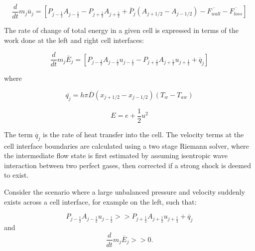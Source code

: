 \documentclass[a4paper,10pt]{article}
\begin{document}
\begin{equation}
\frac{d}{dt} m_{j} \overline{u}_{j} = \left [ P_{j-\frac{1}{2}} A_{j-\frac{1}{2}} - P_{j+\frac{1}{2}} A_{j+\frac{1}{2}} + \overline{P}_{j} ( A_{j+1/2} - A_{j-1/2})- \overline{F_{wall}} - \overline{F_{loss}} \right ] \label{l1d_momentum}
\end{equation}

The rate of change of total energy in a given cell is expressed in terms of the work done at the left and right cell interfaces:

\begin{equation}
\frac{d}{dt} m_{j} \overline{E}_{j} = \left [ P_{j-\frac{1}{2}} A_{j-\frac{1}{2}} u_{j-\frac{1}{2}} - P_{j+\frac{1}{2}} A_{j+\frac{1}{2}} u_{j+\frac{1}{2}} + \overline{q}_{j} \right] \label{l1d_energy}
\end{equation}

where

\begin{equation}
\overline{q_{j}} = h \pi \overline{D} ( x_{j+1/2} - x_{j-1/2} ) ( T_{w} - T_{aw} ) \label{l1d_energy2}
\end{equation}

\begin{equation}
E = e+ \frac{1}{2}u^{2} \label{l1d_energy3}
\end{equation}


The term $\overline{q}_{j}$ is the rate of heat transfer into the cell.  The velocity terms at the cell interface boundaries are calculated using a two stage Riemann solver, where the intermediate flow state is first estimated by assuming isentropic wave interaction between two perfect gases, then corrected if a strong shock is deemed to exist.
\par
\medskip
Consider the scenario where a large unbalanced pressure and velocity suddenly exists across a cell interface, for example on the left, such that:
\par
\begin{equation}
P_{j-\frac{1}{2}} A_{j-\frac{1}{2}} u_{j-\frac{1}{2}} >> P_{j+\frac{1}{2}} A_{j+\frac{1}{2}} u_{j+\frac{1}{2}} + \overline{q}_{j} \label{inequality1}
\end{equation}
and
\begin{equation}
\frac{d}{dt} m_{j} \overline{E}_{j} >> 0. \label{inequality2}
\end{equation}
\end{document}
